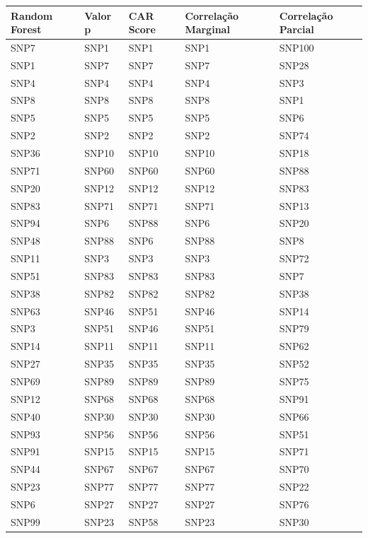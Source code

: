 \begin{table}[ht]
\centering
\begin{tabular}{lllll}
  \hline
Random Forest & Valor p & CAR Score & Correlação Marginal & Correlação Parcial \\ 
  \hline
SNP7 & SNP1 & SNP1 & SNP1 & SNP100 \\ 
  SNP1 & SNP7 & SNP7 & SNP7 & SNP28 \\ 
  SNP4 & SNP4 & SNP4 & SNP4 & SNP3 \\ 
  SNP8 & SNP8 & SNP8 & SNP8 & SNP1 \\ 
  SNP5 & SNP5 & SNP5 & SNP5 & SNP6 \\ 
  SNP2 & SNP2 & SNP2 & SNP2 & SNP74 \\ 
  SNP36 & SNP10 & SNP10 & SNP10 & SNP18 \\ 
  SNP71 & SNP60 & SNP60 & SNP60 & SNP88 \\ 
  SNP20 & SNP12 & SNP12 & SNP12 & SNP83 \\ 
  SNP83 & SNP71 & SNP71 & SNP71 & SNP13 \\ 
  SNP94 & SNP6 & SNP88 & SNP6 & SNP20 \\ 
  SNP48 & SNP88 & SNP6 & SNP88 & SNP8 \\ 
  SNP11 & SNP3 & SNP3 & SNP3 & SNP72 \\ 
  SNP51 & SNP83 & SNP83 & SNP83 & SNP7 \\ 
  SNP38 & SNP82 & SNP82 & SNP82 & SNP38 \\ 
  SNP63 & SNP46 & SNP51 & SNP46 & SNP14 \\ 
  SNP3 & SNP51 & SNP46 & SNP51 & SNP79 \\ 
  SNP14 & SNP11 & SNP11 & SNP11 & SNP62 \\ 
  SNP27 & SNP35 & SNP35 & SNP35 & SNP52 \\ 
  SNP69 & SNP89 & SNP89 & SNP89 & SNP75 \\ 
  SNP12 & SNP68 & SNP68 & SNP68 & SNP91 \\ 
  SNP40 & SNP30 & SNP30 & SNP30 & SNP66 \\ 
  SNP93 & SNP56 & SNP56 & SNP56 & SNP51 \\ 
  SNP91 & SNP15 & SNP15 & SNP15 & SNP71 \\ 
  SNP44 & SNP67 & SNP67 & SNP67 & SNP70 \\ 
  SNP23 & SNP77 & SNP77 & SNP77 & SNP22 \\ 
  SNP6 & SNP27 & SNP27 & SNP27 & SNP76 \\ 
  SNP99 & SNP23 & SNP58 & SNP23 & SNP30 \\ 

\end{tabular}
\end{table}
